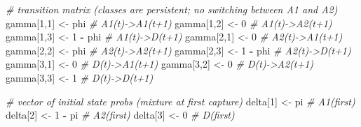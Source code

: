 \documentclass[
  12pt,
]{krantz}
\newenvironment{Shaded}{\begin{snugshade}}{\end{snugshade}}
\newcommand{\CommentTok}[1]{\textcolor[rgb]{0.56,0.35,0.01}{\textit{#1}}}
\newcommand{\DecValTok}[1]{\textcolor[rgb]{0.00,0.00,0.81}{#1}}
\newcommand{\NormalTok}[1]{#1}
\newcommand{\OtherTok}[1]{\textcolor[rgb]{0.56,0.35,0.01}{#1}}
\newcommand{\SpecialCharTok}[1]{\textcolor[rgb]{0.81,0.36,0.00}{\textbf{#1}}}
\begin{document}
\begin{Shaded}
\begin{Highlighting}[]
  \CommentTok{\# transition matrix (classes are persistent; no switching between A1 and A2)}
\NormalTok{  gamma[}\DecValTok{1}\NormalTok{,}\DecValTok{1}\NormalTok{] }\OtherTok{\textless{}{-}}\NormalTok{ phi      }\CommentTok{\# A1(t){-}\textgreater{}A1(t+1)}
\NormalTok{  gamma[}\DecValTok{1}\NormalTok{,}\DecValTok{2}\NormalTok{] }\OtherTok{\textless{}{-}} \DecValTok{0}        \CommentTok{\# A1(t){-}\textgreater{}A2(t+1)}
\NormalTok{  gamma[}\DecValTok{1}\NormalTok{,}\DecValTok{3}\NormalTok{] }\OtherTok{\textless{}{-}} \DecValTok{1} \SpecialCharTok{{-}}\NormalTok{ phi  }\CommentTok{\# A1(t){-}\textgreater{}D(t+1)}
\NormalTok{  gamma[}\DecValTok{2}\NormalTok{,}\DecValTok{1}\NormalTok{] }\OtherTok{\textless{}{-}} \DecValTok{0}        \CommentTok{\# A2(t){-}\textgreater{}A1(t+1)}
\NormalTok{  gamma[}\DecValTok{2}\NormalTok{,}\DecValTok{2}\NormalTok{] }\OtherTok{\textless{}{-}}\NormalTok{ phi      }\CommentTok{\# A2(t){-}\textgreater{}A2(t+1)}
\NormalTok{  gamma[}\DecValTok{2}\NormalTok{,}\DecValTok{3}\NormalTok{] }\OtherTok{\textless{}{-}} \DecValTok{1} \SpecialCharTok{{-}}\NormalTok{ phi  }\CommentTok{\# A2(t){-}\textgreater{}D(t+1)}
\NormalTok{  gamma[}\DecValTok{3}\NormalTok{,}\DecValTok{1}\NormalTok{] }\OtherTok{\textless{}{-}} \DecValTok{0}        \CommentTok{\# D(t){-}\textgreater{}A1(t+1)}
\NormalTok{  gamma[}\DecValTok{3}\NormalTok{,}\DecValTok{2}\NormalTok{] }\OtherTok{\textless{}{-}} \DecValTok{0}        \CommentTok{\# D(t){-}\textgreater{}A2(t+1)}
\NormalTok{  gamma[}\DecValTok{3}\NormalTok{,}\DecValTok{3}\NormalTok{] }\OtherTok{\textless{}{-}} \DecValTok{1}        \CommentTok{\# D(t){-}\textgreater{}D(t+1)}
  
  \CommentTok{\# vector of initial state probs (mixture at first capture)}
\NormalTok{  delta[}\DecValTok{1}\NormalTok{] }\OtherTok{\textless{}{-}}\NormalTok{ pi         }\CommentTok{\# A1(first)}
\NormalTok{  delta[}\DecValTok{2}\NormalTok{] }\OtherTok{\textless{}{-}} \DecValTok{1} \SpecialCharTok{{-}}\NormalTok{ pi     }\CommentTok{\# A2(first)}
\NormalTok{  delta[}\DecValTok{3}\NormalTok{] }\OtherTok{\textless{}{-}} \DecValTok{0}          \CommentTok{\# D(first)}
  

\end{Highlighting}
\end{Shaded}
\end{document}
